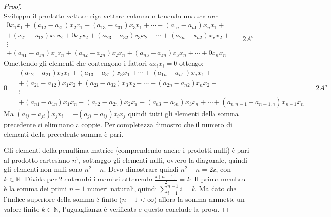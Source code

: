 \begin{proof}
\begin{displaymath}
\end{displaymath}
Sviluppo il prodotto vettore riga-vettore colonna ottenendo uno scalare:
\begin{displaymath}
\begin{array}{c}
0x_{1}x_{1} + (a_{12} - a_{21})x_{2}x_{1} + (a_{13} - a_{31})x_{3}x_{1} + \cdots
+ (a_{1n} - a_{n1})x_{n}x_{1} +\\ 
+ (a_{21} - a_{12})x_{1}x_{2} + 0x_{2}x_{2} + (a_{23} - a_{32})x_{3}x_{2} +
\cdots + (a_{2n} - a_{n2})x_{n}x_{2} + \\ 
\vdots\\
+ (a_{n1} - a_{1n})x_{1}x_{n} + (a_{n2} - a_{2n})x_{2}x_{n} + (a_{n3} -
a_{3n})x_{3}x_{n} + \cdots + 0x_{n}x_{n}
\end{array} = 2 A^{a}
\end{displaymath}
Omettendo gli elementi che contengono i fattori $a x_{i} x_{i} = 0$ ottengo:
\begin{displaymath}
0 = \begin{array}{c}
(a_{12} - a_{21})x_{2}x_{1} + (a_{13} - a_{31})x_{3}x_{1} + \cdots
+ (a_{1n} - a_{n1})x_{n}x_{1} +\\ 
+ (a_{21} - a_{12})x_{1}x_{2} + (a_{23} - a_{32})x_{3}x_{2} +
\cdots + (a_{2n} - a_{n2})x_{n}x_{2} + \\ 
\vdots\\
+ (a_{n1} - a_{1n})x_{1}x_{n} + (a_{n2} - a_{2n})x_{2}x_{n} + (a_{n3} -
a_{3n})x_{3}x_{n} + \cdots + (a_{n,n-1} - a_{n-1,n})x_{n-1}x_{n} 
\end{array} = 2 A^{a}
\end{displaymath}
Ma $(a_{ij} - a_{ji})x_{j}x_{i} = -(a_{ji}-a_{ij})x_{i}x_{j}$ quindi tutti gli
elementi della somma precedente si eliminano a coppie. Per completezza dimostro
che il numero di elementi della precedente somma \`e pari. 

Gli elementi della penultima matrice (comprendendo anche i prodotti nulli) \`e
pari al prodotto cartesiano $n^{2}$, sottraggo gli elementi nulli, ovvero la
diagonale, quindi gli elementi non nulli sono $n^{2} - n$. Devo dimostrare
quindi $n^{2} - n = 2k$, con $k \in \mathbb{N}$. Divido per 2 entrambi i membri
ottenendo $\frac{n(n - 1)}{2} = k$. Il primo membro \`e la somma dei primi $n-1$
numeri naturali, quindi $\sum_{i=1}^{n-1}{i} = k$. Ma dato che l'indice
superiore della somma \`e finito ($n-1 <\infty$) allora la somma ammette un
valore finito $k \in \mathbb{N}$, l'uguaglianza \`e verificata e questo conclude
la prova.
\end{proof}

